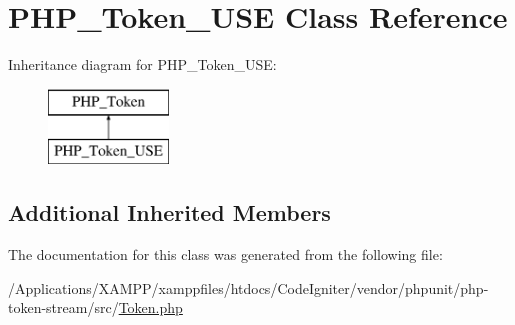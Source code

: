 \hypertarget{class_p_h_p___token___u_s_e}{}\section{P\+H\+P\+\_\+\+Token\+\_\+\+U\+SE Class Reference}
\label{class_p_h_p___token___u_s_e}
Inheritance diagram for P\+H\+P\+\_\+\+Token\+\_\+\+U\+SE\+:\begin{figure}[H]
\begin{center}
\leavevmode
\includegraphics[height=2.000000cm]{class_p_h_p___token___u_s_e}
\end{center}
\end{figure}
\subsection*{Additional Inherited Members}


The documentation for this class was generated from the following file\+:\begin{DoxyCompactItemize}
\item 
/\+Applications/\+X\+A\+M\+P\+P/xamppfiles/htdocs/\+Code\+Igniter/vendor/phpunit/php-\/token-\/stream/src/\mbox{\hyperlink{_token_8php}{Token.\+php}}\end{DoxyCompactItemize}
